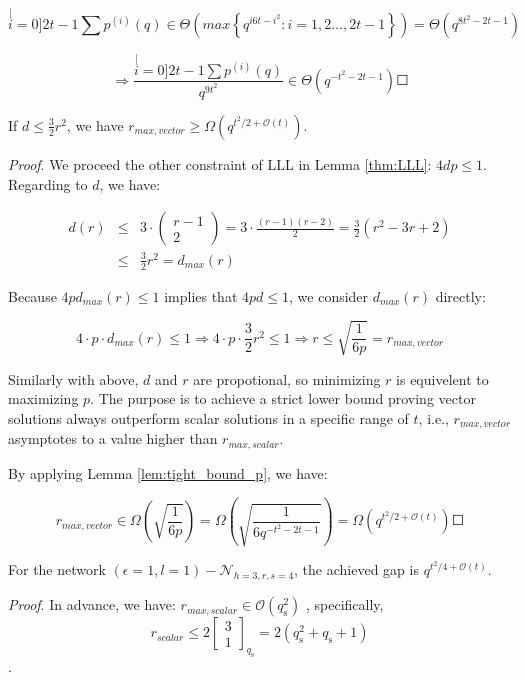 \[
\stackrel[i=0]{2t-1}{\mathop{\sum}}p^{(i)}(q)\in\Theta\left(max\left\{ q^{i6t-i^{2}}:i=1,2\ldots,2t-1\right\} \right)=\Theta\left(q^{8t^{2}-2t-1}\right)
\]

\[
\Rightarrow\frac{\stackrel[i=0]{2t-1}{\mathop{\sum}}p^{(i)}(q)}{q^{9t^{2}}}\in\Theta\left(q^{-t^{2}-2t-1}\right)\Square
\]

\begin{lem}
If $d\leq\frac{3}{2}r^{2}$, we have $r_{max,vector}\geq\Omega\left(q^{t^{2}/2+\mathcal{O}\left(t\right)}\right)$.
\label{lem:lower_bound_r_max_vector}
\end{lem}
\textit{Proof}. We proceed the other constraint of LLL in Lemma \ref{thm:LLL}:
$4dp\leq1$. Regarding to $d$, we have:

\begin{eqnarray*}
d(r) & \leq & 3\cdot\left(\begin{array}{c}
r-1\\
2
\end{array}\right)=3\cdot\frac{\left(r-1\right)\left(r-2\right)}{2}=\frac{3}{2}\left(r^{2}-3r+2\right)\\
 & \leq & \frac{3}{2}r^{2}=d_{max}(r)
\end{eqnarray*}

Because $4pd_{max}(r)\leq1$ implies that $4pd\leq1$, we consider
$d_{max}(r)$ directly:

\[
4\cdot p\cdot d_{max}(r)\leq1\Rightarrow4\cdot p\cdot\frac{3}{2}r^{2}\leq1\Rightarrow r\leq\sqrt{\frac{1}{6p}}=r_{max,vector}
\]

Similarly with above, $d$ and $r$ are propotional, so minimizing
$r$ is equivelent to maximizing $p$. The purpose is to achieve a
strict lower bound proving vector solutions always outperform scalar
solutions in a specific range of $t$, i.e., $r_{max,vector}$ asymptotes
to a value higher than $r_{max,scalar}$.

By applying Lemma \ref{lem:tight_bound_p}, we have:

\[
r_{max,vector}\in\Omega\left(\sqrt{\frac{1}{6p}}\right)=\Omega\left(\sqrt{\frac{1}{6q^{-t^{2}-2t-1}}}\right)=\Omega\left(q^{t^{2}/2+\mathcal{O}\left(t\right)}\right)\Square
\]

\begin{thm}
For the network $\left(\epsilon=1,l=1\right)-\mathcal{N}_{h=3,r,s=4}$,
the achieved gap is $q^{t^{2}/4+\mathcal{O}(t)}$.
\end{thm}
\textit{Proof}. In advance, we have: $r_{max,scalar}\in\mathcal{O}\left(q_{\mathrm{s}}^{2}\right)$
\cite{Wachter-Zeh:2018}, specifically, 
\begin{equation}
r_{scalar}\leq2\left[\begin{array}{c}
3\\
1
\end{array}\right]_{q_{\mathrm{s}}}=2\left(q_{\mathrm{s}}^{2}+q_{\mathrm{s}}+1\right)\label{eq:r_scalar_max}
\end{equation}
. 

